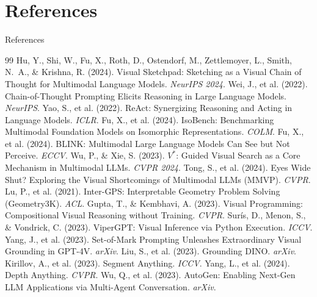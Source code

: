 \documentclass[aspectratio=169]{beamer}
\begin{document}
\section{References}
\begin{frame}[allowframebreaks]{References}
  \scriptsize
  
  \begin{thebibliography}{99}
   Hu, Y., Shi, W., Fu, X., Roth, D., Ostendorf, M.,
    Zettlemoyer, L., Smith, N.\ A., \& Krishna, R. (2024).
    Visual Sketchpad: Sketching as a Visual Chain of Thought for Multimodal
    Language Models. \emph{NeurIPS 2024}.
   Wei, J., et al. (2022). Chain-of-Thought Prompting
    Elicits Reasoning in Large Language Models. \emph{NeurIPS}.
   Yao, S., et al. (2022). ReAct: Synergizing Reasoning
    and Acting in Language Models. \emph{ICLR}.
   Fu, X., et al. (2024). IsoBench: Benchmarking
    Multimodal Foundation Models on Isomorphic Representations. \emph{COLM}.
   Fu, X., et al. (2024). BLINK: Multimodal Large
    Language Models Can See but Not Perceive. \emph{ECCV}.
   Wu, P., \& Xie, S. (2023). $V^*$: Guided Visual Search
    as a Core Mechanism in Multimodal LLMs. \emph{CVPR 2024}.
   Tong, S., et al. (2024). Eyes Wide Shut? Exploring the
    Visual Shortcomings of Multimodal LLMs (MMVP). \emph{CVPR}.
   Lu, P., et al. (2021). Inter-GPS: Interpretable
    Geometry Problem Solving (Geometry3K). \emph{ACL}.
   Gupta, T., \& Kembhavi, A. (2023). Visual
    Programming: Compositional Visual Reasoning without Training. \emph{CVPR}.
   Sur\'is, D., Menon, S., \& Vondrick, C.
    (2023). ViperGPT: Visual Inference via Python Execution. \emph{ICCV}.
   Yang, J., et al. (2023). Set-of-Mark Prompting
    Unleashes Extraordinary Visual Grounding in GPT-4V. \emph{arXiv}.
   Liu, S., et al. (2023). Grounding DINO. \emph{arXiv}.
   Kirillov, A., et al. (2023). Segment Anything.
    \emph{ICCV}.
   Yang, L., et al. (2024). Depth Anything. \emph{CVPR}.
   Wu, Q., et al. (2023). AutoGen: Enabling Next-Gen LLM
    Applications via Multi-Agent Conversation. \emph{arXiv}.
  \end{thebibliography}
\end{frame}
\end{document}
